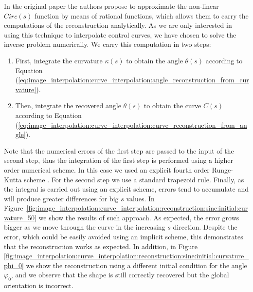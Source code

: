 \documentclass{ipol}
\newcommand{\req}[1]{(\ref{#1})}
\begin{document}
In the original paper the authors propose to approximate the non-linear $Circ(s)$ function by means of rational functions, which allows them to carry the computations of the reconstruction analytically. As we are only interested in using this technique to interpolate control curves, we have chosen to solve the inverse problem numerically. We carry this computation in two steps:
\begin{enumerate}
	\item First, integrate the curvature $\kappa(s)$ to obtain the angle $\theta(s)$ according to Equation  \req{eq:image_interpolation:curve_interpolation:angle_reconstruction_from_curvature}.
	\item Then, integrate the recovered angle $\theta(s)$ to obtain the curve $C(s)$ according to Equation \req{eq:image_interpolation:curve_interpolation:curve_reconstruction_from_angle}.
\end{enumerate} 
Note that the numerical errors of the first step are passed to the input of the second step, thus the integration of the first step is performed using a higher order numerical scheme. In this case we used an explicit fourth order Runge-Kutta scheme \cite{math:numerical:dormand:1980:a_family_of_embedded_runge_kutta}. For the second step we use a standard trapezoid rule.
Finally, as the integral is carried out using an explicit scheme, errors tend to accumulate and will produce greater differences for big $s$ values. In Figure~\ref{fig:image_interpolation:curve_interpolation:reconstruction:sine:initial:curvature_50} we show the results of such approach. As expected, the error grows bigger as we move through the curve in the increasing $s$ direction. 
Despite the error, which could be easily avoided using an implicit scheme, this demonstrates that the reconstruction works as expected. In addition, in Figure \ref{fig:image_interpolation:curve_interpolation:reconstruction:sine:initial:curvature_phi_0} we show the reconstruction using a different initial condition for the angle $\varphi_0$, and we observe that the shape is still correctly recovered but the global orientation is incorrect.
\end{document}
